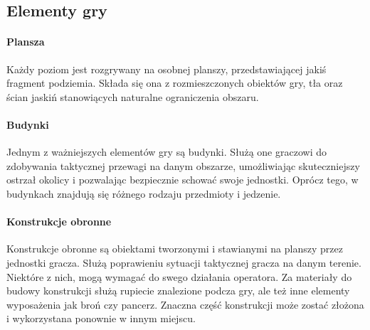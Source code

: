 \documentclass[licencjacka]{pracamgr}
\begin{document}
    \subsection{Elementy gry}
      \paragraph{Plansza}
	Każdy poziom jest rozgrywany na osobnej planszy, przedstawiającej jakiś fragment podziemia. Składa się ona z rozmieszczonych
	obiektów gry, tła oraz ścian jaskiń stanowiących naturalne ograniczenia obszaru.
      \paragraph{Budynki}
	Jednym z ważniejszych elementów gry są budynki. Służą one graczowi do zdobywania taktycznej przewagi na danym
	obszarze, umożliwiając skuteczniejszy ostrzał okolicy i pozwalając bezpiecznie schować swoje jednostki. Oprócz tego,
	w budynkach znajdują się różnego rodzaju przedmioty i jedzenie.
      \paragraph{Konstrukcje obronne}
	Konstrukcje obronne są obiektami tworzonymi i stawianymi na planszy przez jednostki gracza. Służą poprawieniu sytuacji
	taktycznej gracza na danym terenie. Niektóre z nich, mogą wymagać do swego działania operatora. Za materiały do budowy konstrukcji
	służą rupiecie znalezione podcza gry, ale też inne elementy wyposażenia jak broń czy pancerz. Znaczna część konstrukcji może zostać
	złożona i wykorzystana ponownie w innym miejscu.
\end{document}
